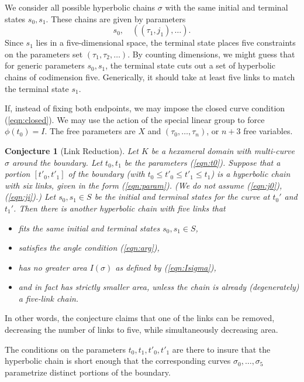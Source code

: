 \documentclass[11pt]{amsart}
\newtheorem{conj}[equation]{Conjecture}
\def\ta{{\tau}}
\begin{document}
We consider all possible hyperbolic chains $\sigma$ with the same
initial and terminal states $s_0,s_1$.  These chains are given by
parameters
  \[
  s_0,\quad ((\ta_1,j_1),\ldots).
  \]
  Since $s_1$ lies in a five-dimensional space, the terminal state
  places five constraints on the parameters set
  $(\ta_1,\ta_2,\ldots)$.  By counting dimensions, we might guess that
  for generic parameters $s_0,s_1$, the terminal state cuts out a set
  of hyperbolic chains of codimension five.  Generically, it should
  take at least five links to match the terminal state $s_1$.

If, instead of fixing both endpoints, we may impose the closed
curve condition (\ref{eqn:closed}). We may use the action of
the special linear group to force $\phi(t_0)=I$.  The free
parameters are $X$ and $(\ta_0,\ldots,\ta_n)$, or $n+3$ free
variables.  



\begin{conj}[Link Reduction] \label{conj:defrag} Let $K$ be a
  hexameral domain with multi-curve $\sigma$ around the boundary.  Let
  $t_0,t_1$ be the parameters (\ref{eqn:t0}).  Suppose that a portion
  $[t'_0,t'_1]$ of the boundary (with $t_0\le t'_0\le t'_1\le t_1$) is
  a hyperbolic chain with six links, given in the form
  (\ref{eqn:param}).  (We do not assume (\ref{eqn:j0}),
  (\ref{eqn:ji}).)  Let $s_0,s_1\in S$ be the initial and terminal
  states for the curve at $t_0'$ and $t_1'$.  Then there is
  another hyperbolic chain with five links that
\begin{itemize}
\item fits the same initial and terminal states $s_0,s_1\in S$,
\item satisfies the angle condition (\ref{eqn:arg}),
\item has no greater area $I(\sigma)$ as defined by (\ref{eqn:Isigma}),
\item and in fact has strictly smaller area, unless the chain is already (degenerately) a 
five-link chain.
\end{itemize}
\end{conj}

In other words, the conjecture claims that one of the links can
be removed, decreasing the number of links to five, while
simultaneously decreasing area.

The conditions on the parameters $t_0,t_1,t'_0,t'_1$ are there to
insure that the hyperbolic chain is short enough that the
corresponding curves $\sigma_0,\ldots,\sigma_5$ parametrize distinct
portions of the boundary.
\end{document}
